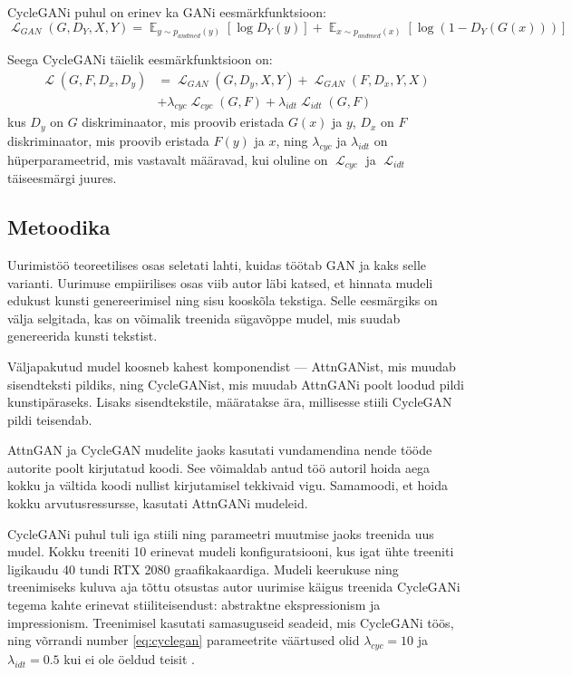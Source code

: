 \documentclass{vilgym}
\DeclareMathOperator{\EX}{\mathbb{E}}
\DeclareMathOperator{\loss}{\mathcal{L}}
\begin{document}
	CycleGANi puhul on erinev ka GANi eesmärkfunktsioon:
	\begin{equation}
		\loss_{GAN}(G,D_Y, X, Y) = \EX_{y\sim p_{andmed}(y)}[\log D_Y(y)] + \EX_{x\sim p_{andmed}(x)}[\log(1-D_Y(G(x)))]
	\end{equation}
	
	Seega CycleGANi täielik eesmärkfunktsioon on:
	\begin{equation} \label{eq:cyclegan}
		\begin{aligned}
			\loss(G, F, D_x, D_y) &= \loss_{GAN}(G, D_y, X, Y) + \loss_{GAN}(F, D_x, Y, X) \\
								  &+ \lambda_{cyc} \loss_{cyc}(G, F) + \lambda_{idt} \loss_{idt}(G, F)
		\end{aligned}
	\end{equation}
	kus $ D_y $ on $ G $ diskriminaator, mis proovib eristada $ G(x) $ ja $ y $, $ D_x $ on  $ F $ diskriminaator, mis proovib eristada $ F(y) $ ja $ x $, ning $ \lambda_{cyc} $ ja $ \lambda_{idt} $ on hüperparameetrid, mis vastavalt määravad, kui oluline on $ \loss_{cyc} $ ja $ \loss_{idt} $ täiseesmärgi juures. \parencite{cyclegan}

	\subsection{Metoodika}
	Uurimistöö teoreetilises osas seletati lahti, kuidas töötab GAN ja kaks selle varianti. Uurimuse empiirilises osas viib autor läbi katsed, et hinnata mudeli edukust kunsti genereerimisel ning sisu kooskõla tekstiga. Selle eesmärgiks on välja selgitada, kas on võimalik treenida sügavõppe mudel, mis suudab genereerida kunsti tekstist.

	Väljapakutud mudel koosneb kahest komponendist --- AttnGANist, mis muudab sisendteksti pildiks, ning CycleGANist, mis muudab AttnGANi poolt loodud pildi kunstipäraseks. Lisaks sisendtekstile, määratakse ära, millisesse stiili CycleGAN pildi teisendab.

	AttnGAN ja CycleGAN mudelite jaoks kasutati vundamendina nende tööde autorite poolt kirjutatud koodi. See võimaldab antud töö autoril hoida aega kokku ja vältida koodi nullist kirjutamisel tekkivaid vigu. Samamoodi, et hoida kokku arvutusressursse, kasutati AttnGANi mudeleid.
	
	CycleGANi puhul tuli iga stiili ning parameetri muutmise jaoks treenida uus mudel. Kokku treeniti 10 erinevat mudeli konfiguratsiooni, kus igat ühte treeniti ligikaudu 40 tundi RTX 2080 graafikakaardiga. Mudeli keerukuse ning treenimiseks kuluva aja tõttu otsustas autor uurimise käigus treenida CycleGANi tegema kahte erinevat stiiliteisendust: abstraktne ekspressionism ja impressionism. Treenimisel kasutati samasuguseid seadeid, mis CycleGANi töös, ning võrrandi number \ref{eq:cyclegan} parameetrite väärtused olid $ \lambda_{cyc} = 10 $ ja $ \lambda_{idt} = 0.5 $ kui ei ole öeldud teisit \parencite{cyclegan}.
\end{document}
